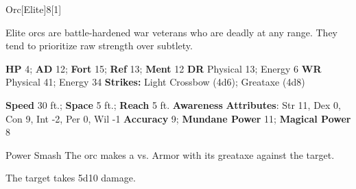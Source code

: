   \begin{monsection}{Orc}[Elite]{8}[1]
    \vspace{-1em}\vspace{-1em}
    \vspace{0em}

    
      Elite orcs are battle-hardened war veterans who are deadly at any range.
      They tend to prioritize raw strength over subtlety.
    

    \begin{spellcontent}
      \begin{spelltargetinginfo}
        \pari \textbf{HP} 4;
          \textbf{AD} 12;
          \textbf{Fort} 15;
          \textbf{Ref} 13;
          \textbf{Ment} 12
        \pari \textbf{DR} Physical 13; Energy 6
        \pari \textbf{WR} Physical 41; Energy 34
        \pari \textbf{Strikes:}
            Light Crossbow  (4d6); Greataxe  (4d8)
      \end{spelltargetinginfo}
    \end{spellcontent}
    \begin{monsterfooter}
      \pari \textbf{Speed} 30 ft.;
        \textbf{Space} 5 ft.;
        \textbf{Reach} 5 ft.
      \pari \textbf{Awareness} 
      \pari \textbf{Attributes}:
        Str 11, Dex 0,
        Con 9, Int -2,
        Per 0, Wil -1
      \pari \textbf{Accuracy} 9;
        \textbf{Mundane Power} 11;
      \textbf{Magical Power} 8
    \end{monsterfooter}
  \end{monsection}
  \begin{freeability}{Power Smash}
      The orc makes a 
         vs. Armor
        with its greataxe against the target.
    
    \hit The target takes 5d10  damage.
    \end{freeability}
  
